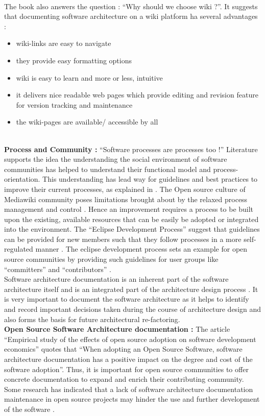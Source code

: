 \\\indent The book also answers the question : \enquote{Why should we choose wiki ?}. It suggests that documenting software architecture on a wiki platform ha several advantages :
\begin{itemize}
\item wiki-links are easy to navigate
\item they provide easy formatting options 
\item wiki is easy to learn and more or less, intuitive
\item it delivers nice readable web pages which provide editing and revision feature for version tracking and maintenance
\item the wiki-pages are available/ accessible by all
\end{itemize}
\indent
\\\indent \textbf{Process and Community : } \enquote{Software processes are processes too !} \cite{Fuggeffa1988}Literature supports the idea the understanding the social environment of software communities has helped to understand their functional model and process-orientation. This understanding has lead way for guidelines and best practices to improve their current processes, as explained in \cite{bab2009}. The Open source culture of Mediawiki community poses limitations brought about by the relaxed process management and control \cite{6923128}. Hence an improvement requires a process to be built upon the existing, available resources that can be easily be adopted or integrated into the environment. The \enquote{Eclipse Development Process} suggest that guidelines can be provided for new members such that they follow processes in a more self-regulated manner \cite{eclipse2013}. The eclipse development process sets an example for open source communities by providing such guidelines for user groups like \enquote{committers} and \enquote{contributors} .
\\\indent Software architecture documentation is an inherent part of the software architecture itself and is an integrated part of the architecture design process \cite{Shahin2009}. It is very important to document the software architecture as it helps to identify and record important decisions taken during the course of architecture design and also forms the basis for future architectural re-factoring.
\newline
\\\indent \textbf{Open Source Software Architecture documentation : } The article \enquote{Empirical study of the effects of open source adoption on software development economics} \cite{Ajila2007} quotes that \enquote{When adopting an Open Source Software, software architecture documentation has a positive impact on the degree and cost of the software adoption}. Thus, it is important for open source communities to offer concrete documentation to expand and enrich their contributing community. Some research has indicated that a lack of software architecture documentation maintenance in open source projects may hinder the use and further development of the software \cite{michlmayr:quality_problems}.
